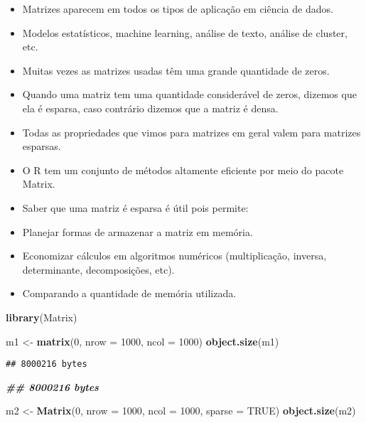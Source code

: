 \documentclass[
]{article}
\newenvironment{Shaded}{\begin{snugshade}}{\end{snugshade}}
\newcommand{\AttributeTok}[1]{\textcolor[rgb]{0.13,0.29,0.53}{#1}}
\newcommand{\ConstantTok}[1]{\textcolor[rgb]{0.56,0.35,0.01}{#1}}
\newcommand{\DecValTok}[1]{\textcolor[rgb]{0.00,0.00,0.81}{#1}}
\newcommand{\DocumentationTok}[1]{\textcolor[rgb]{0.56,0.35,0.01}{\textbf{\textit{#1}}}}
\newcommand{\FunctionTok}[1]{\textcolor[rgb]{0.13,0.29,0.53}{\textbf{#1}}}
\newcommand{\NormalTok}[1]{#1}
\newcommand{\OtherTok}[1]{\textcolor[rgb]{0.56,0.35,0.01}{#1}}
\newcommand{\StringTok}[1]{\textcolor[rgb]{0.31,0.60,0.02}{#1}}
\begin{document}
\begin{itemize}
\item
  Matrizes aparecem em todos os tipos de aplicação em ciência de dados.
\item
  Modelos estatísticos, machine learning, análise de texto, análise de
  cluster, etc.
\item
  Muitas vezes as matrizes usadas têm uma grande quantidade de zeros.
\item
  Quando uma matriz tem uma quantidade considerável de zeros, dizemos
  que ela é esparsa, caso contrário dizemos que a matriz é densa.
\item
  Todas as propriedades que vimos para matrizes em geral valem para
  matrizes esparsas.
\item
  O R tem um conjunto de métodos altamente eficiente por meio do pacote
  Matrix.
\item
  Saber que uma matriz é esparsa é útil pois permite:
\item
  Planejar formas de armazenar a matriz em memória.
\item
  Economizar cálculos em algoritmos numéricos (multiplicação, inversa,
  determinante, decomposições, etc).
\item
  Comparando a quantidade de memória utilizada.
\end{itemize}

\begin{Shaded}
\begin{Highlighting}[]
\FunctionTok{library}\NormalTok{(}\StringTok{\textquotesingle{}Matrix\textquotesingle{}}\NormalTok{)}

\NormalTok{m1 }\OtherTok{\textless{}{-}} \FunctionTok{matrix}\NormalTok{(}\DecValTok{0}\NormalTok{, }\AttributeTok{nrow =} \DecValTok{1000}\NormalTok{, }\AttributeTok{ncol =} \DecValTok{1000}\NormalTok{)}
\FunctionTok{object.size}\NormalTok{(m1)}
\end{Highlighting}
\end{Shaded}

\begin{verbatim}
## 8000216 bytes
\end{verbatim}

\begin{Shaded}
\begin{Highlighting}[]
\DocumentationTok{\#\# 8000216 bytes}

\NormalTok{m2 }\OtherTok{\textless{}{-}} \FunctionTok{Matrix}\NormalTok{(}\DecValTok{0}\NormalTok{, }\AttributeTok{nrow =} \DecValTok{1000}\NormalTok{, }\AttributeTok{ncol =} \DecValTok{1000}\NormalTok{, }\AttributeTok{sparse =} \ConstantTok{TRUE}\NormalTok{)}
\FunctionTok{object.size}\NormalTok{(m2)}
\end{Highlighting}
\end{Shaded}
\end{document}
